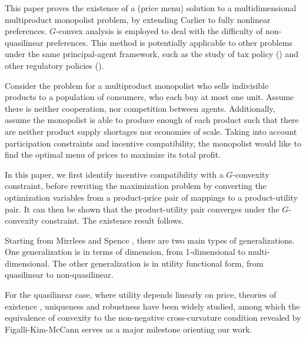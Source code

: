 \documentclass[a4paper, 11pt]{amsart}
\numberwithin{equation}{section}
\theoremstyle{plain}
\theoremstyle{definition}
\theoremstyle{remark}
\begin{document}
	This paper proves the existence of a (price menu) solution to a multidimensional multiproduct monopolist problem, {by extending} %
	Carlier \cite{Carlier01} to fully nonlinear preferences. $G$-convex analysis is employed to deal with the difficulty of non-quasilinear preferences. This method is potentially applicable to other problems under the same principal-agent framework, such as the study of tax policy (\cite{Mirrlees71}) and other regulatory policies (\cite{BaronMyerson82}). \medskip

	


	Consider the problem for a multiproduct monopolist who sells indivisible products to a population of consumers, who each buy at most one unit. Assume there is neither cooperation, nor competition between agents. Additionally, assume the monopolist is able to produce enough of each product such that there are neither product supply shortages {nor economies of scale}. Taking into account participation constraints and incentive compatibility, the monopolist would like to find the optimal menu of prices to maximize its total profit.\medskip

	In this paper, we first identify incentive compatibility with a $G$-convexity constraint, before rewriting the maximization problem by converting the optimization variables from a product-price pair of mappings to a product-utility pair. It can then be shown that the product-utility pair converges under the $G$-convexity constraint. The existence result follows. \medskip






	
Starting from Mirrlees \cite{Mirrlees71} and Spence \cite{Spence74}, there are two main types of generalizations. One generalization is in terms of dimension, from 1-dimensional to multi-dimensional. The other generalization is in utility functional form, from quasilinear to non-quasilinear.\medskip



For the quasilinear case, where utility depends linearly on price, theories of existence \cite{Basov05,RochetStole03,Carlier01,MonteiroPage98}, uniqueness \cite{CarlierLachand-Robert01,MussaRosen78,RochetChone98} and robustness \cite{BaronMyerson82,FigalliKimMcCann11} have been widely studied, among which the equivalence of convexity {to} the non-negative cross-curvature condition revealed by Figalli-Kim-McCann \cite{FigalliKimMcCann11} serves as a major milestone {orienting our work}. \medskip
\end{document}
